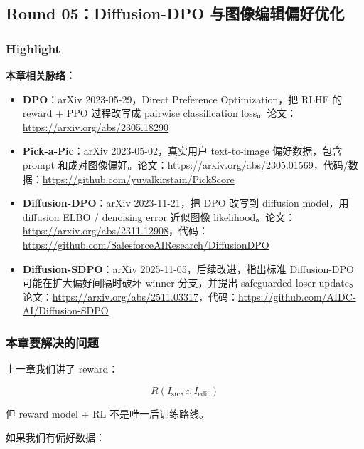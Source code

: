 
\subsection{Round 05：Diffusion-DPO 与图像编辑偏好优化}

\subsubsection{Highlight}

\begin{conceptbox}
\textbf{本章相关脉络：}
\begin{itemize}[leftmargin=1.5em]
  \item \textbf{DPO}：arXiv 2023-05-29，Direct Preference Optimization，把 RLHF 的 reward + PPO 过程改写成 pairwise classification loss。论文：\url{https://arxiv.org/abs/2305.18290}
  \item \textbf{Pick-a-Pic}：arXiv 2023-05-02，真实用户 text-to-image 偏好数据，包含 prompt 和成对图像偏好。论文：\url{https://arxiv.org/abs/2305.01569}，代码/数据：\url{https://github.com/yuvalkirstain/PickScore}
  \item \textbf{Diffusion-DPO}：arXiv 2023-11-21，把 DPO 改写到 diffusion model，用 diffusion ELBO / denoising error 近似图像 likelihood。论文：\url{https://arxiv.org/abs/2311.12908}，代码：\url{https://github.com/SalesforceAIResearch/DiffusionDPO}
  \item \textbf{Diffusion-SDPO}：arXiv 2025-11-05，后续改进，指出标准 Diffusion-DPO 可能在扩大偏好间隔时破坏 winner 分支，并提出 safeguarded loser update。论文：\url{https://arxiv.org/abs/2511.03317}，代码：\url{https://github.com/AIDC-AI/Diffusion-SDPO}
\end{itemize}
\end{conceptbox}

\subsubsection{本章要解决的问题}

上一章我们讲了 reward：

\[
R(I_\text{src},c,I_\text{edit})
\]

但 reward model + RL 不是唯一后训练路线。

如果我们有偏好数据：

